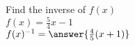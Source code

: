 \documentclass{ximera}
\author{David Kish}
\begin{document}
\begin{exercise}
Find the inverse of $f(x)$\\
$f(x)= \frac{5}{4}x-1$\\
$f(x)^{-1}=\answer{\frac{4}{5}(x+1)}$\\
\end{exercise}
\end{document}
